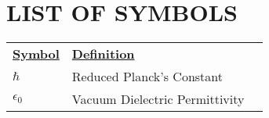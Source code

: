 ~\pagebreak
\chapter*{LIST OF SYMBOLS}

\hspace{-1.35cm}
\begin{tabularx}{\textwidth}{@{}p{} p{} X@{}}
\noindent\textbf{\underline{Symbol}} & \textbf{\underline{Definition}} \\

$\hbar$                       & Reduced Planck's Constant \\
$\epsilon_0$                  & Vacuum Dielectric Permittivity

\end{tabularx}
~\pagebreak